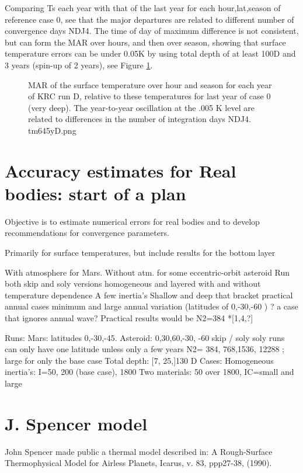 \documentclass{article}
\begin{document}
Comparing Ts each year with that of the last year for each hour,lat,season of reference case 0, see that the major departures are related to different number of convergence days NDJ4.
 The time of day of maximum difference is not consistent, but can form the MAR over hours, and then over season, showing that surface temperature errors can be under 0.05K by using total depth of at least 100D and 3 years (spin-up of 2 years), see Figure \ref{tm645yD}.

\begin{figure}[!ht] 
\caption[ Surface temperature MAR]{MAR of the surface temperature over hour and season for each year of KRC run D, relative to these temperatures for last year of case 0 (very deep). The year-to-year oscillation at the .005 K level are related to differences in the number of integration days NDJ4.  
\label{tm645yD}  tm645yD.png }
\end{figure} 


\clearpage

\section{Accuracy estimates for Real bodies: start of a plan}

Objective is to estimate numerical errors for real bodies and to develop recommendations for convergence parameters. 

Primarily for surface temperatures, but include results for the bottom layer

With atmosphere for Mars. Without atm. for some eccentric-orbit asteroid
\qi Run both skip and soly versions
\qi  homogeneous and layered
\qi  with and without temperature dependence
\qi A few inertia's
\qi Shallow and deep that bracket practical annual cases
\qi minimum and large annual variation (latitudes of 0,-30,-60 )
\qi ? a case that ignores annual wave?
\qi Practical results would be N2=384 *[1,4,?]

Runs: 
\qi    Mars: latitudes 0,-30,-45.  Asteroid: 0,30,60,-30, -60
\qi   skip / soly 
\qii  soly runs can only have one latitude unless only a few years
\qi  N2= 384, 768,1536, 12288 ; large for only the base case
\qii Total depth: [7, 25,]130 D
\qi Cases: 
\qii  Homogeneous inertia's: I=50, 200 (base case), 1800
\qii  Two materials: 50 over 1800, IC=small and large

\section{J. Spencer model}
John Spencer made public a thermal model described in:  
A Rough-Surface Thermophysical Model for Airless Planets, Icarus, v. 83, ppp27-38, (1990). 
\end{document}
